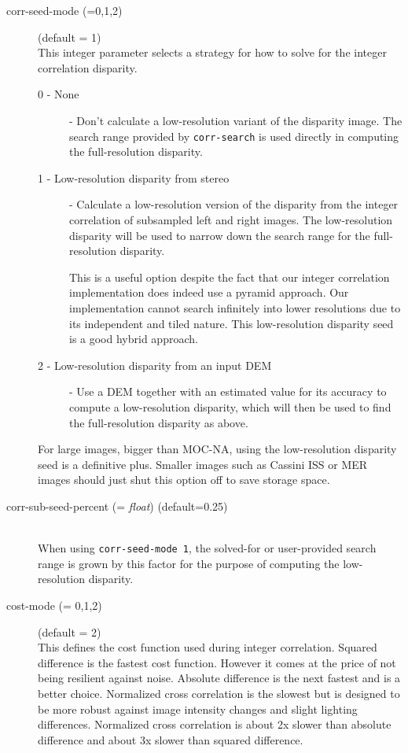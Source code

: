 \begin{description}
\item[corr-seed-mode \textnormal{\small{(=0,1,2)}}] (default = 1) \hfill \\
  This integer parameter selects a strategy for how to solve for the integer
  correlation disparity.
  \begin{description}
    \item[0 - None] - Don't calculate a low-resolution
      variant of the disparity image.
      The search range provided by \texttt{corr-search} is used directly in computing the
      full-resolution disparity.
    \item[1 - Low-resolution disparity from stereo] - Calculate a low-resolution version
      of the disparity from the integer correlation of subsampled left and right images.
      The low-resolution disparity will be used to narrow down the search range
      for the full-resolution disparity.

      This is a useful option despite the fact that our integer
      correlation implementation does indeed use a pyramid
      approach. Our implementation cannot search infinitely into lower
      resolutions due to its independent and tiled nature. This
      low-resolution disparity seed is a good hybrid approach.
    \item[2 - Low-resolution disparity from an input DEM] - Use a DEM together with an estimated
      value for its accuracy to compute a low-resolution disparity, which will then be used
      to find the full-resolution disparity as above.
  \end{description}

  For large images, bigger than MOC-NA, using the low-resolution
  disparity seed is a definitive plus. Smaller images such as Cassini
  ISS or MER images should just shut this option off to save storage
  space.

\item[corr-sub-seed-percent \textnormal{\small{(= \emph{float})}} (default=0.25)] \hfill \\
  When using \texttt{corr-seed-mode 1}, the solved-for or user-provided
  search range is grown by this factor for the purpose of computing the
  low-resolution disparity.

\item[cost-mode \textnormal{\small{(= 0,1,2)}}] (default = 2) \hfill \\

  This defines the cost function used during integer
  correlation. Squared difference is the fastest cost
  function. However it comes at the price of not being resilient
  against noise. Absolute difference is the next fastest and is a
  better choice. Normalized cross correlation is the slowest but is
  designed to be more robust against image intensity changes and
  slight lighting differences. Normalized cross correlation is about
  2x slower than absolute difference and about 3x slower than squared
  difference.


\end{description}
